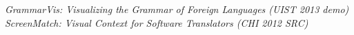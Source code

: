 \documentclass[margin,line]{resume}
\begin{document}
\begin{resume}
\textit{GrammarVis: Visualizing the Grammar of Foreign Languages (UIST 2013 demo)}\\ %
\textit{ScreenMatch: Visual Context for Software Translators (CHI 2012 SRC)}\\ %

\vspace{-6mm}




\end{resume}
\end{document}
